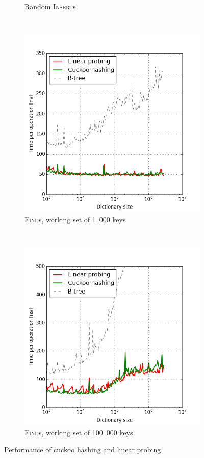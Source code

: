 \begin{figure}
\begin{subfigure}[t]{0.45\textwidth}
	\caption{Random \textsc{Insert}s}
\end{subfigure}
\\
\begin{subfigure}[t]{0.45\textwidth}
	\includegraphics[width=\textwidth]{img/performance/hashing-3}
	\caption{\textsc{Find}s, working set of 1~000 keys}
\end{subfigure}
~
\begin{subfigure}[t]{0.45\textwidth}
	\includegraphics[width=\textwidth]{img/performance/hashing-4}
	\caption{\textsc{Find}s, working set of 100~000 keys}
\end{subfigure}
\caption{Performance of cuckoo hashing and linear probing}
\label{fig:hashing-performance}
\end{figure}

